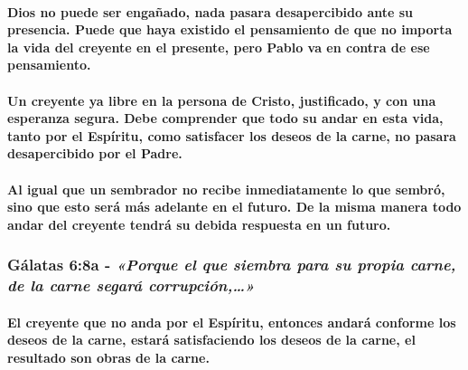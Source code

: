 \documentclass[11a pt,twoside]{article}
\newcommand{\scripture}[1]{%
  {\fontsize{12pt}{16pt}\selectfont\ScriptureFont\itshape #1}%
}
\let\oldsubsubsection\subsubsection
\renewcommand{\subsubsection}{\needspace{4\baselineskip}\oldsubsubsection}
\let\oldparagraph\paragraph
\renewcommand{\paragraph}{\needspace{3\baselineskip}\oldparagraph}
\begin{document}
\paragraph{Dios no puede ser engañado, nada pasara desapercibido ante su
presencia. Puede que haya existido el pensamiento de que no importa la
vida del creyente en el presente, pero Pablo va en contra de ese
pensamiento.}\label{dios-no-puede-ser-engauxf1ado-nada-pasara-desapercibido-ante-su-presencia.-puede-que-haya-existido-el-pensamiento-de-que-no-importa-la-vida-del-creyente-en-el-presente-pero-pablo-va-en-contra-de-ese-pensamiento.}

\paragraph{Un creyente ya libre en la persona de Cristo, justificado, y
con una esperanza segura. Debe comprender que todo su andar en esta
vida, tanto por el Espíritu, como satisfacer los deseos de la carne, no
pasara desapercibido por el
Padre.}\label{un-creyente-ya-libre-en-la-persona-de-cristo-justificado-y-con-una-esperanza-segura.-debe-comprender-que-todo-su-andar-en-esta-vida-tanto-por-el-espuxedritu-como-satisfacer-los-deseos-de-la-carne-no-pasara-desapercibido-por-el-padre.}

\paragraph{Al igual que un sembrador no recibe inmediatamente lo que
sembró, sino que esto será más adelante en el futuro. De la misma manera
todo andar del creyente tendrá su debida respuesta en un
futuro.}\label{al-igual-que-un-sembrador-no-recibe-inmediatamente-lo-que-sembruxf3-sino-que-esto-seruxe1-muxe1s-adelante-en-el-futuro.-de-la-misma-manera-todo-andar-del-creyente-tendruxe1-su-debida-respuesta-en-un-futuro.}

\subsubsection{\texorpdfstring{Gálatas 6:8a -
\scripture{«Porque el que siembra para su propia carne, de la carne segará corrupción,…»}}{Gálatas 6:8a - }}\label{guxe1latas-68a---porque-el-que-siembra-para-su-propia-carne-de-la-carne-segaruxe1-corrupciuxf3n}

\paragraph{El creyente que no anda por el Espíritu, entonces andará
conforme los deseos de la carne, estará satisfaciendo los deseos de la
carne, el resultado son obras de la
carne.}\label{el-creyente-que-no-anda-por-el-espuxedritu-entonces-andaruxe1-conforme-los-deseos-de-la-carne-estaruxe1-satisfaciendo-los-deseos-de-la-carne-el-resultado-son-obras-de-la-carne.}
\end{document}
